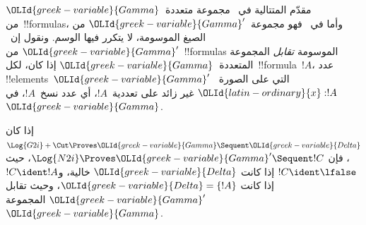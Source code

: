 \documentclass[../../../include/open-logic-section]{subfiles}
\begin{document}


مقدّم المتتالية في~ مجموعة متعددة~$\OLId{greek-variable}{Gamma}$ من~!!{formula}s،
وأما في~ فهو مجموعة~$\OLId{greek-variable}{Gamma}'$ من الصيغ الموسومة، لا يتكرر فيها
الوسم. ونقول إن~$\OLId{greek-variable}{Gamma}'$ من~!!{formula}s الموسومة \emph{تقابل}
المجموعة المتعددة~$\OLId{greek-variable}{Gamma}$ إذا كان، لكل~!!{formula}~$!A$، عدد
!!{element}s~$\OLId{greek-variable}{Gamma}'$ التي على الصورة~$\OLId{latin-ordinary}{x} : !A$ غير زائد على تعددية~$!A$،
أي عدد نسخ~$!A$، في~$\OLId{greek-variable}{Gamma}$.

\begin{prop}
إذا كان $\Log{G2i} + \Cut \Proves \OLId{greek-variable}{Gamma} \Sequent \OLId{greek-variable}{Delta}$، فإن $\Log{N2i}
\Proves \OLId{greek-variable}{Gamma}' \Sequent !C$، حيث $!C \ident \lfalse$ إذا كانت $\OLId{greek-variable}{Delta}$
خالية، و$!C \ident !A$ إذا كانت $\OLId{greek-variable}{Delta} = \{!A\}$، وحيث تقابل $\OLId{greek-variable}{Gamma}'$
المجموعة~$\OLId{greek-variable}{Gamma}$.
\end{prop}
\end{document}

